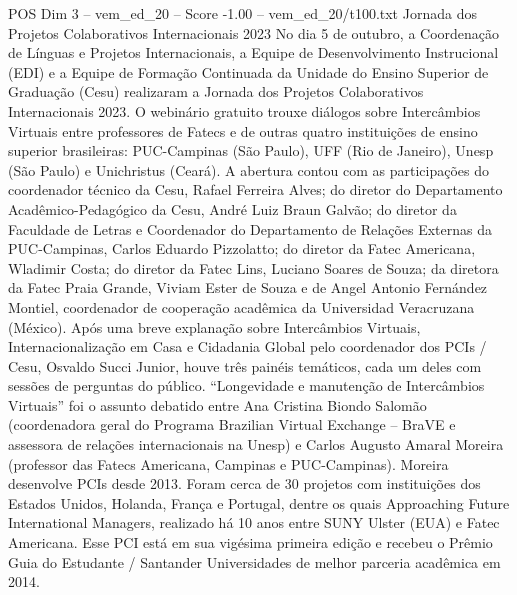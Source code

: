 \begin{textsample}{POS Dim 3 – vem\_ed\_20 – Score -1.00 – vem\_ed\_20/t100.txt}  \label{ex:f3_pos_074}
Jornada dos Projetos Colaborativos Internacionais 2023 No dia 5 de outubro, a Coordenação de Línguas e Projetos Internacionais, a Equipe de Desenvolvimento Instrucional (EDI) e a Equipe de Formação Continuada da Unidade do Ensino Superior de Graduação (Cesu) realizaram a Jornada dos Projetos Colaborativos Internacionais 2023.
O webinário gratuito trouxe diálogos sobre Intercâmbios Virtuais entre professores de Fatecs e de outras quatro instituições de ensino superior brasileiras: PUC-Campinas (São Paulo), UFF (Rio de Janeiro), Unesp (São Paulo) e Unichristus (Ceará).
A abertura contou com as participações do coordenador técnico da Cesu, Rafael Ferreira Alves; do diretor do Departamento Acadêmico-Pedagógico da Cesu, André Luiz Braun Galvão; do diretor da Faculdade de Letras e Coordenador do Departamento de Relações Externas da PUC-Campinas, Carlos Eduardo Pizzolatto; do diretor da Fatec Americana, Wladimir Costa; do diretor da Fatec Lins, Luciano Soares de Souza; da diretora da Fatec Praia Grande, Viviam Ester de Souza e de Angel Antonio Fernández Montiel, coordenador de cooperação acadêmica da Universidad Veracruzana (México).
Após uma breve explanação sobre Intercâmbios Virtuais, Internacionalização em Casa e Cidadania Global pelo coordenador dos PCIs / Cesu, Osvaldo Succi Junior, houve três painéis temáticos, cada um deles com sessões de perguntas do público. “Longevidade e manutenção de Intercâmbios Virtuais” foi o assunto debatido entre Ana Cristina Biondo Salomão (coordenadora geral do Programa Brazilian Virtual Exchange – BraVE e assessora de relações internacionais na Unesp) e Carlos Augusto Amaral Moreira (professor das Fatecs Americana, Campinas e PUC-Campinas).
Moreira desenvolve PCIs desde 2013.
Foram cerca de 30 projetos com instituições dos Estados Unidos, Holanda, França e Portugal, dentre os quais Approaching Future International Managers, realizado há 10 anos entre SUNY Ulster (EUA) e Fatec Americana.
Esse PCI está em sua vigésima primeira edição e recebeu o Prêmio Guia do Estudante / Santander Universidades de melhor parceria acadêmica em 2014.

\end{textsample}
